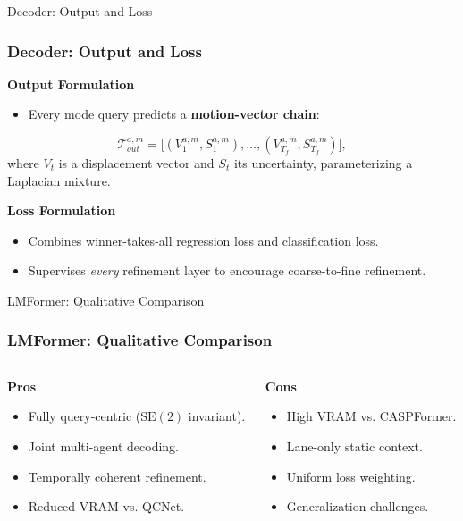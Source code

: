 \documentclass[10pt,aspectratio=169]{beamer}
\newcommand{\greenoplus}{\textcolor{mygreen}{\ding{51}}}
\newcommand{\redominus}{\textcolor{myred}{\ding{55}}}
\begin{document}
\begin{frame}{Decoder: Output and Loss}
    \frametitle{Decoder: Output and Loss}
    \textbf{Output Formulation}
    \begin{itemize}
        \item Every mode query predicts a \textbf{motion-vector chain}:
    \end{itemize}
    \begin{equation}
    \mathcal{T}_{out}^{a,m} = \bigl[(V_1^{a,m},S_1^{a,m}),\dots,(V_{T_f}^{a,m},S_{T_f}^{a,m})\bigr],
    \end{equation}
    where \(V_t\) is a displacement vector and \(S_t\) its uncertainty, parameterizing a Laplacian mixture.

    \vspace{1em}
    \textbf{Loss Formulation}
    \begin{itemize}
        \item Combines winner-takes-all regression loss and classification loss.
        \item Supervises \emph{every} refinement layer to encourage coarse-to-fine refinement.
    \end{itemize}
\end{frame}


\begin{frame}{LMFormer: Qualitative Comparison}
    \frametitle{LMFormer: Qualitative Comparison}
    \begin{columns}[T]
        \begin{column}{0.5\textwidth}
            \textbf{Pros} \greenoplus
            \begin{itemize}
                \item Fully query-centric (\(\mathrm{SE}(2)\) invariant).
                \item Joint multi-agent decoding.
                \item Temporally coherent refinement.
                \item Reduced VRAM vs. QCNet.
            \end{itemize}
        \end{column}
        \begin{column}{0.5\textwidth}
            \textbf{Cons} \redominus
            \begin{itemize}
                \item High VRAM vs. CASPFormer.
                \item Lane-only static context.
                \item Uniform loss weighting.
                \item Generalization challenges.
            \end{itemize}
        \end{column}
    \end{columns}
\end{frame}
\end{document}
